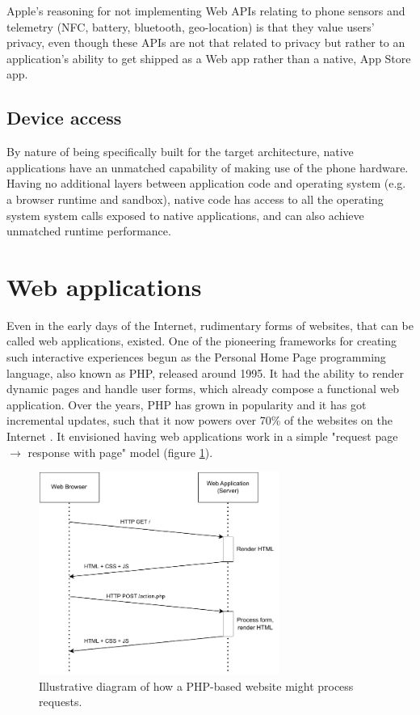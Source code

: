 Apple's reasoning for not implementing Web APIs relating to phone sensors and telemetry (NFC, battery, bluetooth, geo-location) is that they value users' privacy, even though these APIs are not that related to privacy but rather to an application's ability to get shipped as a Web app rather than a native, App Store app.

\subsection{Device access}
By nature of being specifically built for the target architecture, native applications have an unmatched capability of making use of the phone hardware. Having no additional layers between application code and operating system (e.g. a browser runtime and sandbox), native code has access to all the operating system system calls exposed to native applications, and can also achieve unmatched runtime performance.


\section{Web applications}
Even in the early days of the Internet, rudimentary forms of websites, that can be called web applications, existed. One of the pioneering frameworks for creating such interactive experiences begun as the Personal Home Page programming language, also known as PHP, released around 1995. It had the ability to render dynamic pages and handle user forms, which already compose a functional web application. Over the years, PHP has grown in popularity and it has got incremental updates, such that it now powers over 70\% of the websites on the Internet \cite{TurnkeyPHPIsNotDead}. It envisioned having web applications work in a simple "request page $\rightarrow$ response with page" model (figure \ref{FigPHPSeqDiag}).

\begin{figure}[htbp]
    \centering
    \includegraphics[width=0.7\textwidth]{./figures/ch2_php-seq-diag.pdf}
    \caption{Illustrative diagram of how a PHP-based website might process requests.}
    \label{FigPHPSeqDiag}
\end{figure}

